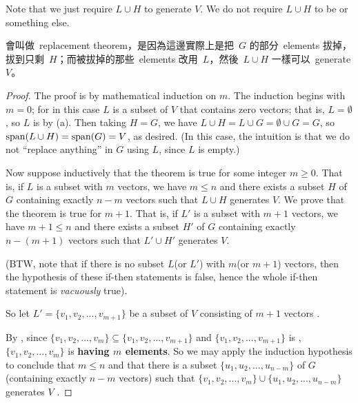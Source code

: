 \begin{note}
Note that we just require \(L \cup H\) to generate \(V\).
We do not require \(L \cup H\) to be \LID{} or something else.
\end{note}

\begin{note}
會叫做\ replacement theorem，是因為這邊實際上是把\ \(G\) 的部分\ elements 拔掉，拔到只剩\ \(H\)；而被拔掉的那些\ elements 改用\ \(L\)，然後\ \(L \cup H\) 一樣可以\ generate \(V\)。
\end{note}

\begin{proof}

The proof is by mathematical induction on \(m\).
The induction begins with \(m = 0\); for in this case \(L\) is a subset of \(V\) that contains zero vectors; that is, \(L = \emptyset\), so \(L\) is \LID{} by (a).
Then taking \(H = G\), we have \(L \cup H = L \cup G = \emptyset \cup G = G\), so \(\operatorname{span}(L \cup H) = \operatorname{span}(G) = V\), as desired.
(In this case, the intuition is that we do not ``replace anything'' in \(G\) using \(L\), since \(L\) is empty.)

Now suppose inductively that the theorem is true for some integer \(m \ge 0\).
That is, if \(L\) is a \LID{} subset with \(m\) vectors, we have \(m \le n\) and there exists a subset \(H\) of \(G\) containing exactly \(n - m\) vectors such that \(L \cup H\) generates \(V\).
We prove that the theorem is true for \(m + 1\).
That is, if \(L'\) is a \LID{} subset with \(m + 1\) vectors, we have \(m + 1 \le n\) and there exists a subset \(H'\) of \(G\) containing exactly \(n - (m + 1)\) vectors such that \(L' \cup H'\) generates \(V\).

(BTW, note that if there is no \LID{} subset \(L\)(or \(L'\)) with \(m\)(or \(m + 1\)) vectors, then the hypothesis of these if-then statements is false, hence the whole if-then statement is \emph{vacuously} true).

So let \(L' = \{ v_1, v_2, ..., v_{m + 1} \}\) be a \LID{} subset of \(V\) consisting of \(m + 1\) vectors \BLUE{(*)}.

By , since \(\{ v_1, v_2, ..., v_m \} \subseteq \{ v_1, v_2, ..., v_{m + 1} \}\) and \(\{ v_1, v_2, ..., v_{m + 1} \}\) is \LID{}, \(\{ v_1, v_2, ..., v_m \}\) is \LID{} \textbf{having \(m\) elements}.
So we may apply the induction hypothesis to conclude that \(m \le n\) and that there is a subset \(\{ u_1, u_2, ..., u_{n - m} \}\) of \(G\) (containing exactly \(n - m\) vectors) such that \(\{ v_1, v_2, ..., v_m \} \cup \{u_1, u_2, ..., u_{n - m} \}\) generates \(V\) .


\end{proof}
